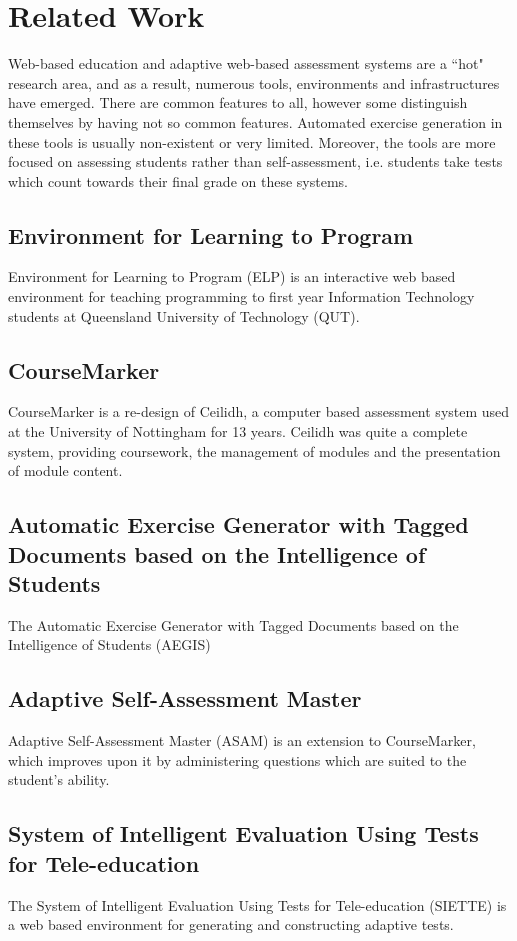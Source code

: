 \documentclass[11pt,a4paper]{report}
\begin{document}
\section{Related Work}
Web-based education and adaptive web-based assessment systems are a ``hot" research area, and as a result, numerous tools, environments and infrastructures have emerged. There are common features to all, however some distinguish themselves by having not so common features.
Automated exercise generation in these tools is usually non-existent or very limited. Moreover, the tools are more focused on assessing students rather than self-assessment, i.e. students take tests which count towards their final grade on these systems.

\subsection{Environment for Learning to Program}
Environment for Learning to Program (ELP) is an interactive web based environment for teaching programming to first year Information Technology students at Queensland University of Technology (QUT).

\subsection{CourseMarker}
CourseMarker is a re-design of Ceilidh, a computer based assessment system used at the University of Nottingham for 13 years. Ceilidh was quite a complete system, providing coursework, the management of modules and the presentation of module content.

\subsection{Automatic Exercise Generator with Tagged Documents based on the Intelligence of Students}
The Automatic Exercise Generator with Tagged Documents based on the Intelligence of Students (AEGIS)

\subsection{Adaptive Self-Assessment Master}
Adaptive Self-Assessment Master (ASAM) is an extension to CourseMarker, which improves upon it by administering questions which are suited to the student's ability.

\subsection{System of Intelligent Evaluation Using Tests for Tele-education}
The System of Intelligent Evaluation Using Tests for Tele-education (SIETTE) is a web based environment for generating and constructing adaptive tests.
\end{document}
